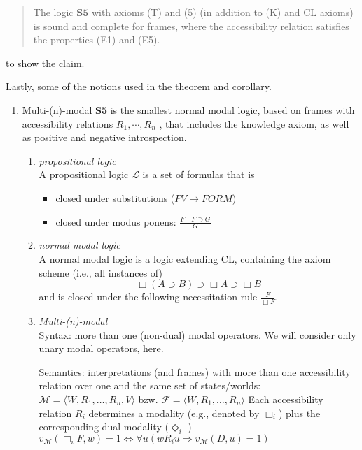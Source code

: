 \documentclass[11pt,a4paper]{article}
\newcommand{\lto}{\supset}
\newcommand{\some}{\Diamond}
\newcommand{\all}{\Box}
\newcommand{\sto}{\Rightarrow}
\begin{document}
\begin{quote}
The logic  $\mathbf{S5}$ with axioms (T) and (5) (in
addition to (K) and CL axioms) is sound and complete for frames,
where the accessibility relation satisfies the properties (E1) and (E5).
\end{quote}

to show the claim.


Lastly, some of the notions used in the theorem and corollary.
\begin{enumerate}
\item 
Multi-(n)-modal \textbf{S5} is the smallest normal modal logic, based on frames with accessibility relations $R_1 ,\cdots , R_n$ , that includes the knowledge axiom, as well as positive and negative introspection.

\begin{enumerate}
\item \textit{propositional logic} \\
A propositional logic $\mathcal{L}$ is a set of formulas that is
\begin{itemize}
\item closed under substitutions ($PV \mapsto FORM$)
\item closed under modus ponens: $\frac{F \quad F \lto G}{G}$
\end{itemize}

\item \textit{normal modal logic} \\
A normal modal logic is a logic extending CL, containing
the axiom scheme (i.e., all instances of)
\begin{equation*}
\all (A \lto B) \lto \all A \lto \all B
\end{equation*}
and is closed under the following necessitation rule $\frac{F}{\all F}$.


\item \textit{Multi-(n)-modal} \\
Syntax:
more than one (non-dual) modal operators. We will consider
only unary modal operators, here.

Semantics:
interpretations (and frames) with more than one accessibility
relation over one and the same set of states/worlds:
$\mathcal{M} = \langle W , R_1 , \dots,  R_n , V \rangle$ bzw. $\mathcal{F} = \langle W , R_1 , \dots,  R_n  \rangle$ 
Each accessibility relation $R_i$ determines a modality (e.g.,
denoted by $\all_i$) plus the corresponding dual modality ($\some_i$ )
 $v_{\mathcal{M}}(\all_iF,w)=1 \iff \forall u (wR_iu \sto v_{\mathcal{M}}(D,u)=1)$


\end{enumerate}
\end{enumerate}
\end{document}
